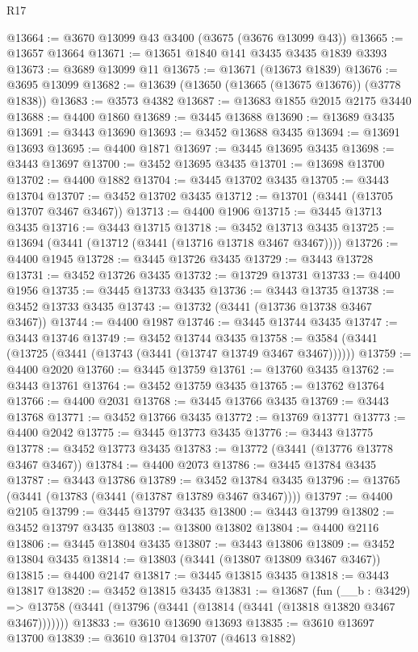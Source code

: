 \begin{lexlean}{R17}
\begin{coremodule}
@13664 := @3670 @13099 @43 @3400 (@3675 (@3676 @13099 @43))
@13665 := @13657 @13664
@13671 := @13651 @1840 @141 @3435 @3435 @1839 @3393
@13673 := @3689 @13099 @11
@13675 := @13671 (@13673 @1839)
@13676 := @3695 @13099
@13682 := @13639 (@13650 (@13665 (@13675 @13676)) (@3778 @1838))
@13683 := @3573 @4382
@13687 := @13683 @1855 @2015 @2175 @3440
@13688 := @4400 @1860
@13689 := @3445 @13688
@13690 := @13689 @3435
@13691 := @3443 @13690
@13693 := @3452 @13688 @3435
@13694 := @13691 @13693
@13695 := @4400 @1871
@13697 := @3445 @13695 @3435
@13698 := @3443 @13697
@13700 := @3452 @13695 @3435
@13701 := @13698 @13700
@13702 := @4400 @1882
@13704 := @3445 @13702 @3435
@13705 := @3443 @13704
@13707 := @3452 @13702 @3435
@13712 := @13701 (@3441 (@13705 @13707 @3467 @3467))
@13713 := @4400 @1906
@13715 := @3445 @13713 @3435
@13716 := @3443 @13715
@13718 := @3452 @13713 @3435
@13725 := @13694 (@3441 (@13712 (@3441 (@13716 @13718 @3467 @3467))))
@13726 := @4400 @1945
@13728 := @3445 @13726 @3435
@13729 := @3443 @13728
@13731 := @3452 @13726 @3435
@13732 := @13729 @13731
@13733 := @4400 @1956
@13735 := @3445 @13733 @3435
@13736 := @3443 @13735
@13738 := @3452 @13733 @3435
@13743 := @13732 (@3441 (@13736 @13738 @3467 @3467))
@13744 := @4400 @1987
@13746 := @3445 @13744 @3435
@13747 := @3443 @13746
@13749 := @3452 @13744 @3435
@13758 := @3584 (@3441 (@13725 (@3441 (@13743 (@3441 (@13747 @13749 @3467 @3467))))))
@13759 := @4400 @2020
@13760 := @3445 @13759
@13761 := @13760 @3435
@13762 := @3443 @13761
@13764 := @3452 @13759 @3435
@13765 := @13762 @13764
@13766 := @4400 @2031
@13768 := @3445 @13766 @3435
@13769 := @3443 @13768
@13771 := @3452 @13766 @3435
@13772 := @13769 @13771
@13773 := @4400 @2042
@13775 := @3445 @13773 @3435
@13776 := @3443 @13775
@13778 := @3452 @13773 @3435
@13783 := @13772 (@3441 (@13776 @13778 @3467 @3467))
@13784 := @4400 @2073
@13786 := @3445 @13784 @3435
@13787 := @3443 @13786
@13789 := @3452 @13784 @3435
@13796 := @13765 (@3441 (@13783 (@3441 (@13787 @13789 @3467 @3467))))
@13797 := @4400 @2105
@13799 := @3445 @13797 @3435
@13800 := @3443 @13799
@13802 := @3452 @13797 @3435
@13803 := @13800 @13802
@13804 := @4400 @2116
@13806 := @3445 @13804 @3435
@13807 := @3443 @13806
@13809 := @3452 @13804 @3435
@13814 := @13803 (@3441 (@13807 @13809 @3467 @3467))
@13815 := @4400 @2147
@13817 := @3445 @13815 @3435
@13818 := @3443 @13817
@13820 := @3452 @13815 @3435
@13831 := @13687
    (fun (__b : @3429) =>
    @13758 (@3441 (@13796 (@3441 (@13814 (@3441 (@13818 @13820 @3467 @3467)))))))
@13833 := @3610 @13690 @13693
@13835 := @3610 @13697 @13700
@13839 := @3610 @13704 @13707 (@4613 @1882)

\end{coremodule}
\end{lexlean}
